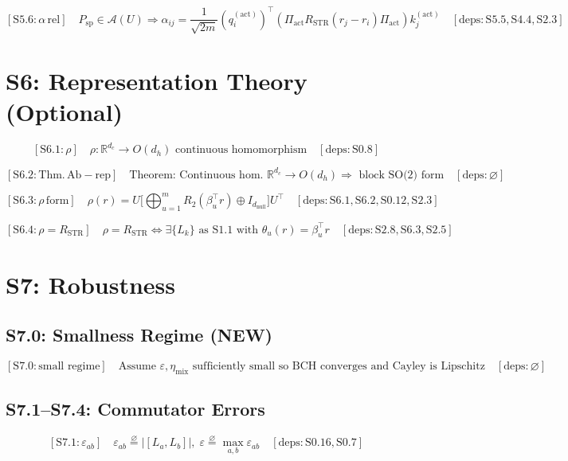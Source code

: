 \documentclass[11pt]{article}
\newcommand{\Real}{\mathbb{R}}
\newcommand{\eqdef}{\overset{\varnothing}{=}}
\newcommand{\deps}[1]{\quad[\mathrm{deps}:#1]}
\begin{document}
\[
\boxed{[\mathrm{S5}.6:\alpha\,\mathrm{rel}]}\quad
P_{\mathrm{sp}}\in\mathcal{A}(U) \Rightarrow
\alpha_{ij}=\frac{1}{\sqrt{2m}}
(q_i^{(\mathrm{act})})^\top
(\Pi_{\mathrm{act}}R_{\mathrm{STR}}(r_j-r_i)\Pi_{\mathrm{act}})
k_j^{(\mathrm{act})}
\deps{\mathrm{S5}.5,\mathrm{S4}.4,\mathrm{S2}.3}
\]

\section*{S6: Representation Theory (Optional)}

\[
\boxed{[\mathrm{S6}.1:\rho]}\quad
\rho:\Real^{d_c}\to O(d_h) \text{ continuous homomorphism}
\deps{\mathrm{S0}.8}
\]

\[
\boxed{[\mathrm{S6}.2:\mathrm{Thm.\,Ab-rep}]}\quad
\text{Theorem: Continuous hom. } \Real^{d_c}\to O(d_h) \Rightarrow \text{ block SO(2) form}
\deps{\varnothing}
\]

\[
\boxed{[\mathrm{S6}.3:\rho\,\mathrm{form}]}\quad
\rho(r)=U\Big[\bigoplus_{u=1}^m R_2(\beta_u^\top r)\oplus I_{d_{\mathrm{null}}}\Big]U^\top
\deps{\mathrm{S6}.1,\mathrm{S6}.2,\mathrm{S0}.12,\mathrm{S2}.3}
\]

\[
\boxed{[\mathrm{S6}.4:\rho=R_{\mathrm{STR}}]}\quad
\rho=R_{\mathrm{STR}} \Leftrightarrow \exists\{L_k\}\text{ as S1.1 with }\theta_u(r)=\beta_u^\top r
\deps{\mathrm{S2}.8,\mathrm{S6}.3,\mathrm{S2}.5}
\]

\section*{S7: Robustness}

\subsection*{S7.0: Smallness Regime (NEW)}

\[
\boxed{[\mathrm{S7}.0:\text{small regime}]}\quad
\text{Assume } \varepsilon,\eta_{\mathrm{mix}} \text{ sufficiently small so BCH converges and Cayley is Lipschitz}
\deps{\varnothing}
\]

\subsection*{S7.1--S7.4: Commutator Errors}

\[
\boxed{[\mathrm{S7}.1:\varepsilon_{ab}]}\quad
\varepsilon_{ab} \eqdef |[L_a,L_b]|,\;
\varepsilon \eqdef \max_{a,b}\varepsilon_{ab}
\deps{\mathrm{S0}.16,\mathrm{S0}.7}
\]
\end{document}

